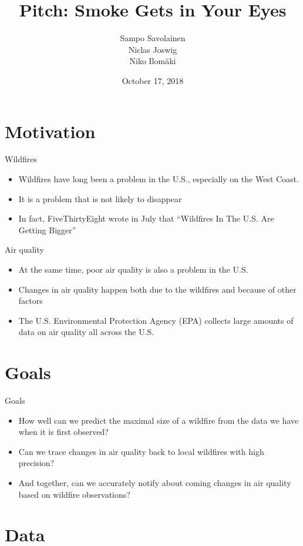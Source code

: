 \documentclass{beamer}
\title[Smoke Gets in Your Eyes]{Pitch: Smoke Gets in Your Eyes}
\author{Sampo Savolainen \\Niclas Joswig \\Niko Ilomäki}
\institute{University of Helsinki}
\date{October 17, 2018}
\begin{document}
\begin{frame}[plain]
\titlepage
\end{frame}

\section{Motivation}

\begin{frame}{Wildfires}
\begin{itemize}
\item Wildfires have long been a problem in the U.S., especially on the West Coast.
\item It is a problem that is not likely to disappear
\item In fact, FiveThirtyEight wrote in July that ``Wildfires In The U.S. Are Getting Bigger''
\end{itemize}
\end{frame}

\begin{frame}{Air quality}
\begin{itemize}
\item At the same time, poor air quality is also a problem in the U.S.
\item Changes in air quality happen both due to the wildfires and because of other factors
\item The U.S. Environmental Protection Agency (EPA) collects large amounts of data on air quality all across the U.S.
\end{itemize}
\end{frame}

\section{Goals}

\begin{frame}{Goals}
\begin{itemize}
\item How well can we predict the maximal size of a wildfire from the data we have when it is first observed?
\item Can we trace changes in air quality back to local wildfires with high precision?
\item And together, can we accurately notify about coming changes in air quality based on wildfire observations?
\end{itemize}
\end{frame}

\section{Data}
\end{document}
